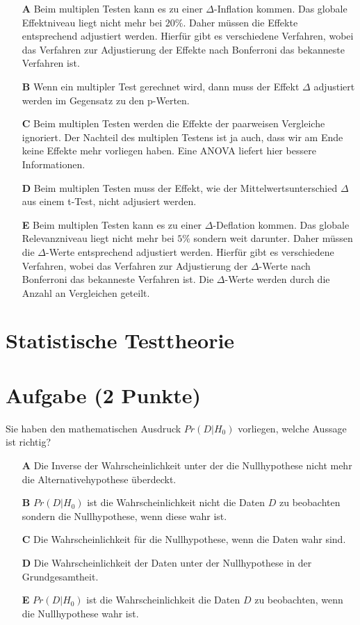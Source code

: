 \documentclass[a4paper, 9pt]{scrartcl}\usepackage[]{graphicx}\usepackage[]{xcolor}
\begin{document}
\begin{enumerate}
\item [\textbf{A} \msquare] Beim multiplen Testen kann es zu einer $\Delta$-Inflation kommen. Das globale Effektniveau liegt nicht mehr bei $20\%$. Daher müssen die Effekte entsprechend adjustiert werden. Hierfür gibt es verschiedene Verfahren, wobei das Verfahren zur Adjustierung der Effekte nach Bonferroni das bekanneste Verfahren ist.
\item [\textbf{B} \msquare] Wenn ein multipler Test gerechnet wird, dann muss der Effekt $\Delta$ adjustiert werden im Gegensatz zu den p-Werten.
\item [\textbf{C} \msquare] Beim multiplen Testen werden die Effekte der paarweisen Vergleiche ignoriert. Der Nachteil des multiplen Testens ist ja auch, dass wir am Ende keine Effekte mehr vorliegen haben. Eine ANOVA liefert hier bessere Informationen.
\item [\textbf{D} \msquare] Beim multiplen Testen muss der Effekt, wie der Mittelwertsunterschied $\Delta$ aus einem t-Test, nicht adjusiert werden.
\item [\textbf{E} \msquare] Beim multiplen Testen kann es zu einer $\Delta$-Deflation kommen. Das globale Relevanzniveau liegt nicht mehr bei $5\%$ sondern weit darunter. Daher müssen die $\Delta$-Werte entsprechend adjustiert werden. Hierfür gibt es verschiedene Verfahren, wobei das Verfahren zur Adjustierung der $\Delta$-Werte nach Bonferroni das bekanneste Verfahren ist. Die $\Delta$-Werte werden durch die Anzahl an Vergleichen geteilt.
\end{enumerate}
\section*{Statistische Testtheorie}  

\section{Aufgabe \hfill (2 Punkte)}




Sie haben den mathematischen Ausdruck $Pr(D|H_0)$ vorliegen, welche Aussage ist richtig?



\begin{enumerate}
\item [\textbf{A} \msquare] Die Inverse der Wahrscheinlichkeit unter der die Nullhypothese nicht mehr die Alternativehypothese überdeckt.
\item [\textbf{B} \msquare] $Pr(D|H_0)$ ist die Wahrscheinlichkeit nicht die Daten $D$ zu beobachten sondern die Nullhypothese, wenn diese wahr ist.
\item [\textbf{C} \msquare] Die Wahrscheinlichkeit für die Nullhypothese, wenn die Daten wahr sind.
\item [\textbf{D} \msquare] Die Wahrscheinlichkeit der Daten unter der Nullhypothese in der Grundgesamtheit.
\item [\textbf{E} \msquare] $Pr(D|H_0)$ ist die Wahrscheinlichkeit die Daten $D$ zu beobachten, wenn die Nullhypothese wahr ist.
\end{enumerate}
\end{document}
